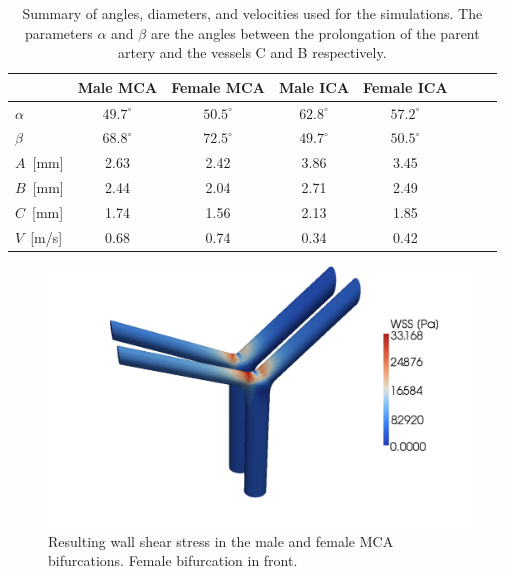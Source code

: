 \begin{table}
  \begin{center}
    \begin{tabular}{l|*{6}{c}r}
      & Male MCA & Female MCA & Male ICA & Female ICA \\
      \hline
      $\alpha$	  & $49.7^\circ$ & $50.5^\circ$   & $62.8^\circ$ & $57.2^\circ$\\
$\beta$		  & $68.8^\circ$ & $72.5^\circ$   & $49.7^\circ$ & $50.5^\circ$\\
      $A$~[mm]		  & 2.63 & 2.42   & 3.86 & 3.45\\
      $B$~[mm]           & 2.44 & 2.04   & 2.71 & 2.49\\
      $C$~[mm] 	  & 1.74 & 1.56   & 2.13 & 1.85\\
      $V$~[m/s]	  & 0.68   & 0.74     & 0.34   & 0.42  \\
    \end{tabular}
  \end{center}
    \caption{Summary of angles, diameters, and velocities used for the
      simulations. The parameters $\alpha$ and $\beta$ are the angles
      between the prolongation of the parent artery and the vessels C
      and B respectively.}
    \label{bcs}
\end{table}

\begin{figure}
  \center\includegraphics[width=\largefig]{chapters/kvs-2/pdf/mcas_wss_II4.pdf}
    \caption{Resulting wall shear stress in the male and female MCA
      bifurcations. Female bifurcation in front.}
    \label{fig:kvs-2:mca_wss_res}
\end{figure}

